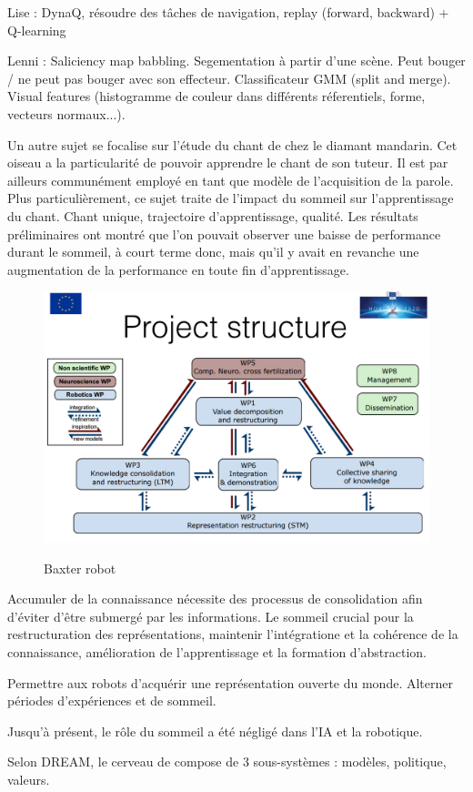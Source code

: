 \documentclass{llncs}
\begin{document}
Lise : DynaQ, résoudre des tâches de navigation, replay (forward, backward) + Q-learning

Lenni : Saliciency map babbling. Segementation à partir d'une scène. Peut bouger / ne peut pas bouger avec son effecteur.
 Classificateur GMM (split and merge). Visual features (histogramme de couleur dans différents réferentiels, forme, vecteurs normaux...).

Un autre sujet se focalise sur l'étude du chant de chez le diamant mandarin. Cet oiseau a la particularité de pouvoir apprendre le chant de son tuteur. Il est par ailleurs communément employé en tant que modèle de l'acquisition de la parole. Plus particulièrement, ce sujet traite de l'impact du sommeil sur l'apprentissage du chant. Chant unique, trajectoire d'apprentissage, qualité.
Les résultats préliminaires ont montré que l'on pouvait observer une baisse de performance durant le sommeil, à court terme donc, mais qu'il y avait en revanche une  augmentation de la performance en toute fin d'apprentissage.

\begin{figure}
	\centering
	\includegraphics[width=.7\textwidth]{figures/project_structure.png}
	\label{fig:dream}
	\caption{Baxter robot}
\end{figure}

Accumuler de la connaissance nécessite des processus de consolidation afin d'éviter d'être submergé par les informations. Le sommeil crucial pour la restructuration des représentations, maintenir l'intégratione et la cohérence de la connaissance, amélioration de l'apprentissage et la formation d'abstraction.

Permettre aux robots d'acquérir une représentation ouverte du monde. Alterner périodes d'expériences et de sommeil.

Jusqu'à présent, le rôle du sommeil a été négligé dans l'IA et la robotique.

Selon DREAM, le cerveau de compose de 3 sous-systèmes : modèles, politique, valeurs.
\end{document}
